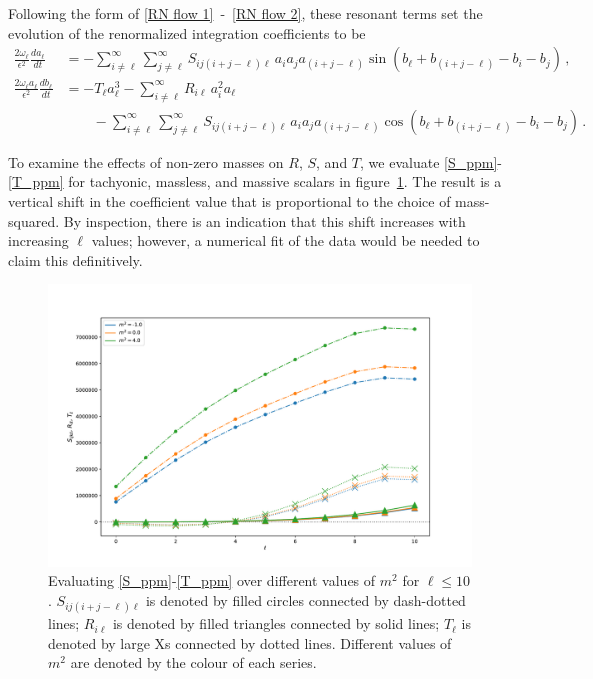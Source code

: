 \documentclass[letterpaper,11pt]{article}
\newcommand{\ol}{\omega_\ell}
\begin{document}
Following the form of \eqref{RN flow 1}~-~\eqref{RN flow 2}, these resonant terms set the evolution of the renormalized integration coefficients to be \cite{1412.3249}
\begin{align}
\frac{2 \ol}{\epsilon^2} \frac{d a_\ell}{d t} &= -  \sum_{i \neq \ell}^\infty \sum_{j \neq \ell}^\infty S_{i j (i + j - \ell) \ell} \, a_i a_j a_{(i + j - \ell)} \sin ( b_\ell + b_{(i+j-\ell)} - b_i - b_j ) \, , \\
\frac{2 \ol a_\ell}{\epsilon^2} \frac{d b_\ell}{d t} &= - T_\ell a_\ell^3 - \sum^\infty_{i \neq \ell} R_{i\ell} \, a_i^2 a_\ell \nonumber \\
%
& \qquad - \sum_{i \neq \ell}^\infty \sum_{j \neq \ell}^\infty S_{i j (i + j - \ell) \ell} \, a_i a_j a_{(i + j - \ell)} \cos( b_\ell + b_{(i+j-\ell)} - b_i - b_j ) \, .
\end{align}

To examine the effects of non-zero masses on $R$, $S$, and $T$, we evaluate \eqref{S_ppm}-\eqref{T_ppm} for tachyonic, massless, and massive scalars in figure~\ref{fig: Nmodes}. The result is a vertical shift in the coefficient value that is proportional to the choice of mass-squared. By inspection, there is an indication that this shift increases with increasing $\ell$ values; however, a numerical fit of the data would be needed to claim this definitively. 

\begin{figure}
\centering
	\includegraphics[width=\textwidth]{./figures/Nmodesplot}
	\caption{Evaluating \eqref{S_ppm}-\eqref{T_ppm} over different values of $m^2$ for $\ell \leq 10$. $S_{ij(i+j-\ell)\ell}$ is denoted by filled circles connected by dash-dotted lines; $R_{i\ell}$ is denoted by filled triangles connected by solid lines; $T_{\ell}$ is denoted by large Xs connected by dotted lines. Different values of $m^2$ are denoted by the colour of each series.}
	\label{fig: Nmodes}
\end{figure}
\end{document}
